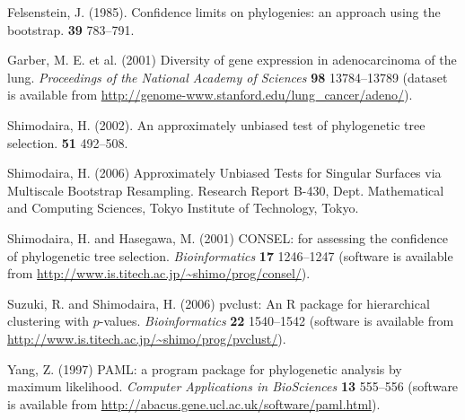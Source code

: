 \documentclass[a4paper]{amsart}
\begin{document}
\begin{thebibliography}{9}

Felsenstein, J.
(1985).
\newblock Confidence limits on phylogenies: an approach using the bootstrap.
 {\bf 39} 783--791.

  Garber, M. E. et al. (2001)
\newblock Diversity of gene expression in adenocarcinoma of the lung.
\newblock \emph{Proceedings of the National Academy of Sciences}
  {\bf 98} 13784--13789 (dataset is available from
  \url{http://genome-www.stanford.edu/lung_cancer/adeno/}).

Shimodaira, H.
(2002).
\newblock An approximately unbiased test of phylogenetic tree selection.
 {\bf 51} 492--508.

Shimodaira, H.
(2006)
\newblock Approximately Unbiased Tests for Singular
Surfaces via Multiscale Bootstrap Resampling.
\newblock Research Report {B}-430, Dept. Mathematical and Computing
  Sciences, Tokyo Institute of Technology, Tokyo.

Shimodaira, H. and Hasegawa, M. (2001)
\newblock CONSEL: for assessing the
  confidence of phylogenetic tree selection.
\newblock \emph{Bioinformatics} {\bf 17} 1246--1247 (software is available from
  \url{http://www.is.titech.ac.jp/~shimo/prog/consel/}).

Suzuki, R. and Shimodaira, H. (2006)
\newblock pvclust: An R package for hierarchical clustering with $p$-values.
\newblock \emph{Bioinformatics} {\bf 22} 1540--1542 (software is available from
\url{http://www.is.titech.ac.jp/~shimo/prog/pvclust/}).

Yang, Z. (1997)
\newblock  PAML: a program package for phylogenetic analysis by
  maximum likelihood.
\newblock \emph{Computer Applications in BioSciences}
{\bf 13} 555--556 (software is available from
  \url{http://abacus.gene.ucl.ac.uk/software/paml.html}).


\end{thebibliography}
\end{document}
